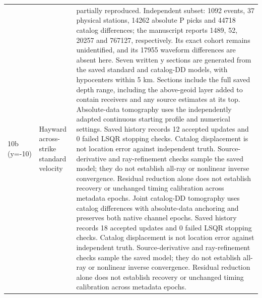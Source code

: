 \begin{longtable}{>{\raggedright\arraybackslash}p{}>{\raggedright\arraybackslash}p{}>{\raggedright\arraybackslash}p{}}
10b (y=-10) & Hayward across-strike standard velocity & partially reproduced. Independent subset: 1092 events, 37 physical stations, 14262 absolute P picks and 44718 catalog differences; the manuscript reports 1489, 52, 20257 and 767127, respectively. Its exact cohort remains unidentified, and its 17955 waveform differences are absent here. Seven written y sections are generated from the saved standard and catalog-DD models, with hypocenters within 5 km. Sections include the full saved depth range, including the above-geoid layer added to contain receivers and any source estimates at its top. Absolute-data tomography uses the independently adapted continuous starting profile and numerical settings. Saved history records 12 accepted updates and 0 failed LSQR stopping checks. Catalog displacement is not location error against independent truth. Source-derivative and ray-refinement checks sample the saved model; they do not establish all-ray or nonlinear inverse convergence. Residual reduction alone does not establish recovery or unchanged timing calibration across metadata epochs. Joint catalog-DD tomography uses catalog differences with absolute-data anchoring and preserves both native channel epochs. Saved history records 18 accepted updates and 0 failed LSQR stopping checks. Catalog displacement is not location error against independent truth. Source-derivative and ray-refinement checks sample the saved model; they do not establish all-ray or nonlinear inverse convergence. Residual reduction alone does not establish recovery or unchanged timing calibration across metadata epochs.\\

\end{longtable}
